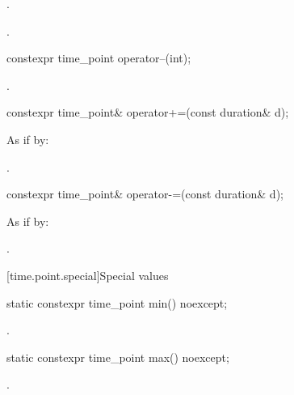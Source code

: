 \begin{itemdescr}
\pnum
\effects
{}.

\pnum
\returns
{}.
\end{itemdescr}

%
\begin{itemdecl}
constexpr time_point operator--(int);
\end{itemdecl}

\begin{itemdescr}
\pnum
\returns
{}.
\end{itemdescr}

%
\begin{itemdecl}
constexpr time_point& operator+=(const duration& d);
\end{itemdecl}

\begin{itemdescr}
\pnum
\effects
As if by: 

\pnum
\returns
{}.
\end{itemdescr}

%
\begin{itemdecl}
constexpr time_point& operator-=(const duration& d);
\end{itemdecl}

\begin{itemdescr}
\pnum
\effects
As if by: 

\pnum
\returns
{}.
\end{itemdescr}

[time.point.special]{Special values}

%
\begin{itemdecl}
static constexpr time_point min() noexcept;
\end{itemdecl}

\begin{itemdescr}
\pnum
\returns
{}.
\end{itemdescr}

%
\begin{itemdecl}
static constexpr time_point max() noexcept;
\end{itemdecl}

\begin{itemdescr}
\pnum
\returns
{}.
\end{itemdescr}

